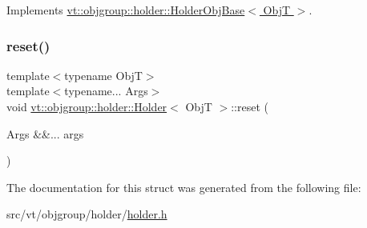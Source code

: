Implements \hyperlink{structvt_1_1objgroup_1_1holder_1_1_holder_obj_base_a4b350b0126259d31a62fd426a08f6698}{vt\+::objgroup\+::holder\+::\+Holder\+Obj\+Base$<$ Obj\+T $>$}.

\mbox{\label{structvt_1_1objgroup_1_1holder_1_1_holder_a4ce99c48b611a65189a6891c780b6500}} 
\subsubsection{\texorpdfstring{reset()}{reset()}}
{\footnotesize\ttfamily template$<$typename ObjT$>$ \\
template$<$typename... Args$>$ \\
void \hyperlink{structvt_1_1objgroup_1_1holder_1_1_holder}{vt\+::objgroup\+::holder\+::\+Holder}$<$ ObjT $>$\+::reset (\begin{DoxyParamCaption}\item[{Args \&\&...}]{args }\end{DoxyParamCaption})\hspace{0.3cm}{\ttfamily [inline]}}



The documentation for this struct was generated from the following file\+:\begin{DoxyCompactItemize}
\item 
src/vt/objgroup/holder/\hyperlink{objgroup_2holder_2holder_8h}{holder.\+h}\end{DoxyCompactItemize}
